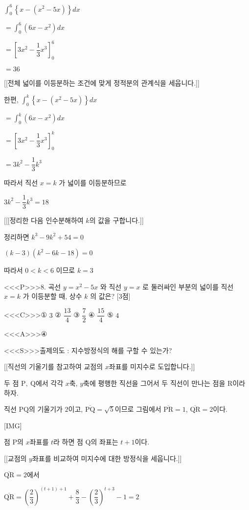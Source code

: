 \documentclass{oblivoir}
\begin{document}
$\displaystyle\int_{0}^{6}\left\{x-\left(x^{2}-5 x\right)\right\} d x$

$=\displaystyle\int_{0}^{6}\left(6 x-x^{2}\right) d x$

$=\left[3 x^{2}-\dfrac{1}{3} x^{3}\right]_{0}^{6}$

$=36$

[[전체 넓이를 이등분하는 조건에 맞게 정적분의 관계식을 세웁니다.]]

한편, $\displaystyle\int_{0}^{k}\left\{x-\left(x^{2}-5 x\right)\right\} d x$

$=\displaystyle\int_{0}^{k}\left(6 x-x^{2}\right) d x$

$=\left[3 x^{2}-\dfrac{1}{3} x^{3}\right]_{0}^{k}$

$=3 k^{2}-\dfrac{1}{3} k^{3}$

따라서 직선 $x=k$ 가 넓이를 이등분하므로

$3 k^{2}-\dfrac{1}{3} k^{3} =18$

[[[정리한 다음 인수분해하여 $k$의 값을 구합니다.]]

정리하면 $k^{3}-9 k^{2}+54=0$

$(k-3)\left(k^{2}-6 k-18\right)=0$

따라서 $0< k< 6$ 이므로 $k=3$

<<<P>>>8. 곡선 $y=x^{2}-5 x$ 와 직선 $y=x$ 로 둘러싸인 부분의 넓이를 직선 $x=k$ 가 이등분할 때, 상수 $k$ 의 값은? [3점]

<<<C>>>① $3$
② $\dfrac{13}{4}$
③ $\dfrac{7}{2}$
④ $\dfrac{15}{4}$
⑤ $4$

<<<A>>>④

<<<S>>>출제의도 : 지수방정식의 해를 구할 수 있는가?

[[직선의 기울기를 참고하여 교점의 $x$좌표를 미지수로 도입합니다.]]

두 점 $\mathrm{P},\:\mathrm{Q}$에서 각각 $x$축, $y$축에 평행한 직선을 그어서 두 직선이 만나는 점을 $\mathrm{R}$이라 하자.

직선 $\mathrm{PQ}$의 기울기가 $2$이고, $\overline{\mathrm{PQ}}=\sqrt{5}$이므로 그림에서 $\overline{\mathrm{PR}}=1$, $\overline{\mathrm{QR}}=2$이다.

[IMG]

점 $\mathrm{P}$의 $x$좌표를 $t$라 하면 점 $\mathrm{Q}$의 좌표는 $t+1$이다.

[[교점의 $y$좌표를 비교하여 미지수에 대한 방정식을 세웁니다.]]

$\overline{\mathrm{QR}}=2$에서 

$\overline{\mathrm{QR}}=\left(\dfrac{2}{3}\right)^{(t+1)+1}+\dfrac{8}{3}-\left(\dfrac{2}{3}\right)^{t+3}-1=2$
\end{document}
